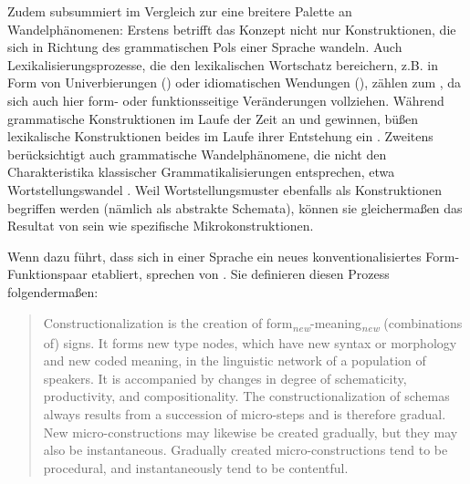Zudem subsummiert  im Vergleich zur  eine breitere Palette an Wandelphänomenen: Erstens betrifft das Konzept nicht nur Konstruktionen, die sich in Richtung des grammatischen Pols einer Sprache wandeln. Auch Lexikalisierungsprozesse,  die den lexikalischen Wortschatz bereichern, z.B. in Form von Univerbierungen () oder idiomatischen Wendungen (), zählen zum  \parencite[64]{Hilpert2011}, da sich auch hier form- oder funktionsseitige Veränderungen vollziehen. Während grammatische Konstruktionen  im Laufe der Zeit an  und  gewinnen, büßen lexikalische Konstruktionen beides im Laufe ihrer Entstehung ein \parencite[vgl.][164]{Traugott2013}. Zweitens berücksichtigt  auch grammatische Wandelphänomene, die nicht den Charakteristika klassischer Grammatikalisierungen  entsprechen, etwa Wortstellungswandel \parencite[vgl.][65]{Hilpert2011}. Weil Wortstellungsmuster  ebenfalls als Konstruktionen begriffen werden (nämlich als abstrakte Schemata),  können sie gleichermaßen das Resultat von  sein wie spezifische Mikrokonstruktionen. 

Wenn  dazu führt, dass sich in einer Sprache ein neues konventionalisiertes Form-Funktionspaar etabliert, sprechen \textcite{Traugott2013} von . Sie definieren diesen Prozess folgendermaßen:  \blockcquote[22]{Traugott2013}{Constructionalization is the creation of form\textsubscript{\textit{new}}-meaning\textsubscript{\textit{new}} (combinations of) signs. It forms new type nodes, which have new syntax or morphology and new coded meaning, in the linguistic network of a population of speakers. It is accompanied by changes in degree of schematicity,
productivity, and compositionality. The constructionalization of schemas
always results from a succession of micro-steps and is therefore gradual.
New micro-constructions may likewise be created gradually, but they may
also be instantaneous. Gradually created micro-constructions tend to be
procedural, and instantaneously tend to be
contentful.}


